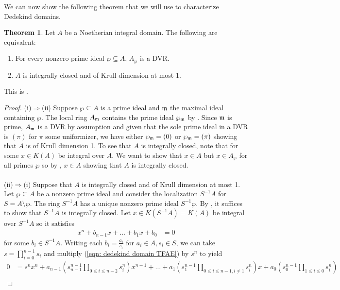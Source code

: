 \documentclass{amsart}
\theoremstyle{definition}
\newtheorem{theorem}{Theorem}[section]
\numberwithin{equation}{section}
\begin{document}
We can now show the following theorem that we will use to characterize Dedekind domains. 
\begin{theorem}\label{thm: dedekind TFAE}
  Let $A$ be a Noetherian integral domain. The following are equivalent:
  \begin{enumerate}[label=(\roman*)]
    \item For every nonzero prime ideal $\wp\subseteq A$, $A_{\wp}$ is a DVR. 
    \item $A$ is integrally closed and of Krull dimension at most 1. 
  \end{enumerate}
\end{theorem}
This is \cite[Ch. 1, \S 1, Prop. 4]{Serre}. 
\begin{proof}
  (i)$\Longrightarrow$(ii) Suppose $\wp\subseteq A$ is a prime ideal and $\mathfrak{m}$ the maximal ideal containing $\wp$. The local ring $A_{\mathfrak{m}}$ contains the prime ideal $\wp_{\mathfrak{m}}$ by . Since $\mathfrak{m}$ is prime, $A_{\mathfrak{m}}$ is a DVR by assumption and given that the sole prime ideal in a DVR is $(\pi)$ for $\pi$ some uniformizer, we have either $\wp_{\mathfrak{m}}=(0)$ or $\wp_{\mathfrak{m}}=(\pi)$ showing that $A$ is of Krull dimension 1. To see that $A$ is integrally closed, note that for some $x\in K(A)$ be integral over $A$. We want to show that $x\in A$ but $x\in A_{\wp}$ for all primes $\wp$ so by , $x\in A$ showing that $A$ is integrally closed. 
  \\\\
  (ii)$\Longrightarrow$(i) Suppose that $A$ is integrally closed and of Krull dimension at most 1. Let $\wp\subseteq A$ be a nonzero prime ideal and consider the localization $S^{-1}A$ for $S=A\setminus\wp$. The ring $S^{-1}A$ has a unique nonzero prime ideal $S^{-1}\wp$. By , it suffices to show that $S^{-1}A$ is integrally closed. Let $x\in K(S^{-1}A)=K(A)$ be integral over $S^{-1}A$ so it satisfies
  \begin{align}\label{eqn: dedekind domain TFAE}
    x^{n}+b_{n-1}x+\dots+b_{1}x+b_{0} &= 0
  \end{align}
  for some $b_{i}\in S^{-1}A$. Writing each $b_{i}=\frac{a_{i}}{s_{i}}$ for $a_{i}\in A, s_{i}\in S$, we can take $s=\prod_{i=0}^{n-1}s_{i}$ and multiply (\ref{eqn: dedekind domain TFAE}) by $s^{n}$ to yield 
  \small
  \begin{align*}
    0 &= s^{n}x^{n}+a_{n-1}\left(s_{n-1}^{n-1}\prod_{0\leq i\leq n-2}s_{i}^{n}\right)x^{n-1}+\dots+a_{1}\left(s_{1}^{n-1}\prod_{0\leq i\leq n-1, i\neq 1}s_{i}^{n}\right)x+a_{0}\left(s_{0}^{n-1}\prod_{1\leq i\leq 0}s_{i}^{n}\right) \\

\end{align*}
\end{proof}
\end{document}
